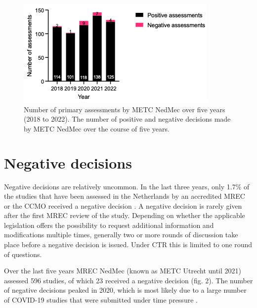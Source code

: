 \documentclass[authordate, empirical]{jote-new-article}
\begin{document}
	\begin{figure}[t!]
		\begin{fullwidth}
		\includegraphics[width=\linewidth]{media/Picture2.png}

		\caption{ Number of primary assessments by METC NedMec over five years (2018 to 2022). The number of positive and negative decisions made by METC NedMec over the course of five years.}

		\label{fig:rId12}

		\end{fullwidth}
	\end{figure}


	\section{Negative decisions}



	Negative decisions are relatively uncommon. In the last three years, only 1.7\% of the studies that have been assessed in the Netherlands by an accredited MREC or the CCMO received a negative decision \parencites{CCMO2023}. A negative decision is rarely given after the first MREC review of the study. Depending on whether the applicable legislation offers the possibility to request additional information and modifications multiple times, generally two or more rounds of discussion take place before a negative decision is issued. Under CTR this is limited to one round of questions.







	Over the last five years MREC NedMec (known as METC Utrecht until 2021) assessed 596 studies, of which 23 received a negative decision (fig. 2). The number of negative decisions peaked in 2020, which is most likely due to a large number of COVID-19 studies that were submitted under time pressure \parencites{METCUtrecht2020}.
\end{document}
